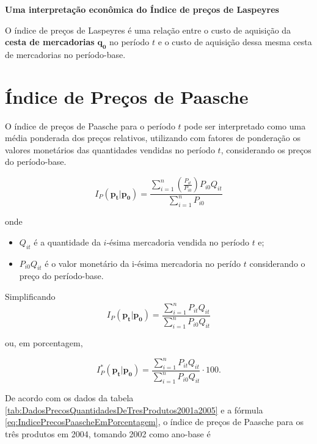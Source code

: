 \documentclass[
]{book}
\providecommand{\tightlist}{%
  \setlength{\itemsep}{0pt}\setlength{\parskip}{0pt}}
\begin{document}
\textbf{Uma interpretação econômica do Índice de preços de Laspeyres}

O índice de preços de Laspeyres é uma relação entre o custo de aquisição da \textbf{cesta de mercadorias} \(\mathbf{q_0}\) no período \(t\) e o custo de aquisição
dessa mesma cesta de mercadorias no período-base.

\hypertarget{uxedndice-de-preuxe7os-de-paasche}{%
\section{Índice de Preços de Paasche}\label{uxedndice-de-preuxe7os-de-paasche}}

O índice de preços de Paasche para o período \(t\) pode ser interpretado como uma média
ponderada dos preços relativos, utilizando com fatores de ponderação os valores monetários das quantidades vendidas no período \(t\), considerando os preços do período-base.

\begin{equation}
  I_P(\mathbf{p_t}| \mathbf{p_0}) = 
  \frac{\sum_{i=1}^{n}\left(\frac{P_{it}}{P_{i0}}\right)P_{i0}Q_{it}}{\sum_{i=1}^{n}P_{i0}}
  \label{eq:IndicePrecosPaascheDefinicao}
\end{equation}

onde

\begin{itemize}
\tightlist
\item
  \(Q_{it}\) é a quantidade da \(i\)-ésima mercadoria vendida no período \(t\) e;
\item
  \(P_{i0}Q_{it}\) é o valor monetário da i-ésima mercadoria no perído \(t\)
  considerando o preço do período-base.
\end{itemize}

Simplificando
\begin{equation}
  I_P(\mathbf{p_t}| \mathbf{p_0}) =
  \frac{\sum_{i=1}^{n}P_{it}Q_{it}}{\sum_{i=1}^{n}P_{i0}Q_{it}}
  \label{eq:IndicePrecosPaasche}
\end{equation}

ou, em porcentagem,

\begin{equation}
  I_P^*(\mathbf{p_t}| \mathbf{p_0}) = 
  \frac{\sum_{i=1}^{n}P_{it}Q_{it}}{\sum_{i=1}^{n}P_{i0}Q_{it}}\cdot 100.
  \label{eq:IndicePrecosPaascheEmPorcentagem}
\end{equation}

De acordo com os dados da tabela \ref{tab:DadosPrecosQuantidadesDeTresProdutos2001a2005} e a fórmula \eqref{eq:IndicePrecosPaascheEmPorcentagem}, o índice
de preços de Paasche para os três produtos em 2004, tomando 2002 como ano-base é
\end{document}
